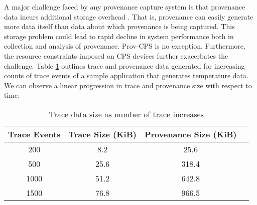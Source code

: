 %



%
%
%
%
%

A major challenge faced by any provenance capture system is that provenance data incurs additional storage overhead \cite{issue_provenance}. That is, provenance can easily generate more data itself than data about which provenance is being captured. This storage problem could lead to rapid decline in system performance both in collection and analysis of provenance. Prov-CPS is no exception. Furthermore,  the resource constraints imposed on CPS devices further exacerbates the challenge. Table \ref{table:prov_growth} outlines trace and provenance data generated for increasing counts of trace events of a sample application that generates temperature data. We can observe a linear progression in trace and provenance size with respect to time.

\begin{table} 
\caption{Trace data size as number of trace increases }
\label{table:prov_growth}
\begin{center}
 \begin{tabular}{||c| c| c| c||} 
 \hline
 \textbf{Trace Events} & \textbf{Trace Size (KiB)} & \textbf{Provenance Size (KiB)}  \\ [0.5ex] 
 \hline\hline
 200 & 8.2 & 25.6 \\ 
 \hline
 500 & 25.6 & 318.4 \\
 \hline
 1000 & 51.2 & 642.8 \\
 \hline
 1500 & 76.8 & 966.5 \\
 \hline
\end{tabular}

\end{center}
\end{table}


